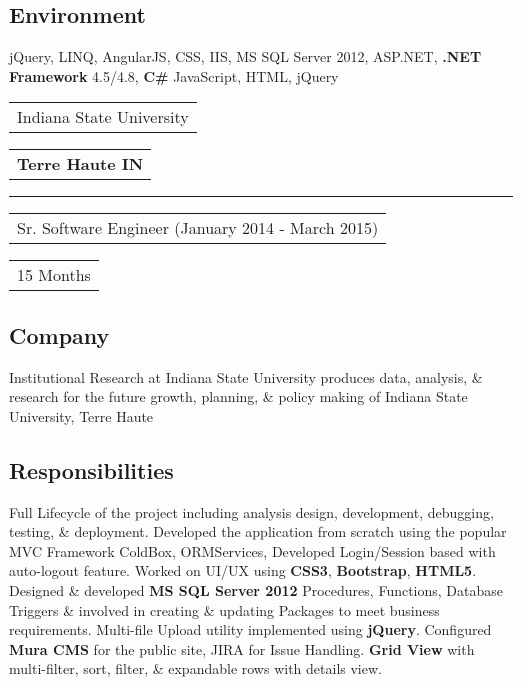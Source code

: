 \documentclass[letterpaper,11pt]{article}
\begin{document}
    \subsection{Environment}
    jQuery, LINQ, AngularJS, CSS, IIS, MS SQL Server 2012, ASP.NET, \textbf{\color{darkgray}.NET Framework} 4.5/4.8, \textbf{\color{darkgray}C\#} JavaScript, HTML, jQuery
    


    \vspace{1.27cm}
    \noindent
    \begin{tabular}[t]{@{}l}
    \Large{Indiana State University}
    \end{tabular}
    \hfill
    \begin{tabular}[t]{l@{}}
    \textbf{\color{darkgray}Terre Haute IN}
    \end{tabular}
    \noindent\rule{\textwidth}{0.5pt}
    \begin{tabular}[t]{@{}l}
    Sr. Software Engineer (January 2014 - March 2015)
    \end{tabular}
    \hfill
    \begin{tabular}[t]{l@{}}
    15 Months
    \end{tabular}

    \subsection{Company}
    Institutional Research at Indiana State University produces data, analysis, \& research for the future growth, planning, \& policy making of Indiana State University, Terre Haute

    \subsection{Responsibilities}
    Full Lifecycle of the project including analysis design, development, debugging, testing, \& deployment. Developed the application from scratch using the popular MVC Framework ColdBox, ORMServices, Developed Login/Session based with auto-logout feature. Worked on UI/UX using \textbf{\color{darkgray}CSS3}, \textbf{\color{darkgray}Bootstrap}, \textbf{\color{darkgray}HTML5}. Designed \& developed \textbf{\color{darkgray}MS SQL Server 2012} Procedures, Functions, Database Triggers \& involved in creating \& updating Packages to meet business requirements. Multi-file Upload utility implemented using \textbf{\color{darkgray}jQuery}. Configured \textbf{\color{darkgray}Mura CMS} for the public site, JIRA for Issue Handling. \textbf{\color{darkgray}Grid View} with multi-filter, sort, filter, \& expandable rows with details view.
\end{document}
